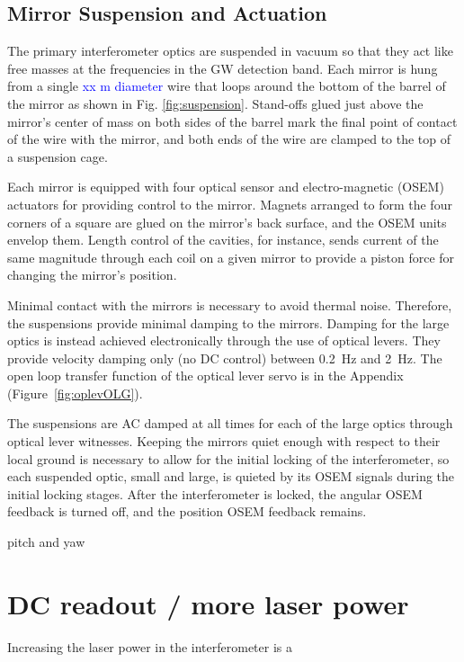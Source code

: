 \subsection{Mirror Suspension and Actuation}
\label{sec:suspension}
The primary interferometer optics are suspended in vacuum so that they
act like free masses at the frequencies in the GW detection band. Each
mirror is hung from a single \textcolor{blue}{xx m diameter} wire that
loops around the bottom of the barrel of the mirror as shown in
Fig. \ref{fig:suspension}. Stand-offs glued just above the mirror's
center of mass on both sides of the barrel mark the final point of
contact of the wire with the mirror, and both ends of the wire are
clamped to the top of a suspension cage.

Each mirror is equipped with four optical sensor and electro-magnetic
(OSEM) actuators for providing control to the mirror. Magnets arranged
to form the four corners of a square are glued on the mirror's back
surface, and the OSEM units envelop them. Length control of the
cavities, for instance, sends current of the same magnitude through
each coil on a given mirror to provide a piston force for changing the
mirror's position.

Minimal contact with the mirrors is necessary to avoid thermal
noise. Therefore, the suspensions provide minimal damping to the
mirrors. Damping for the large optics is instead achieved
electronically through the use of optical levers. They provide
velocity damping only (no DC control) between 0.2~Hz and 2~Hz. The
open loop transfer function of the optical lever servo is in the
Appendix (Figure~\ref{fig:oplevOLG}).

The suspensions are AC damped at all times for each of the large
optics through optical lever witnesses. Keeping the mirrors quiet
enough with respect to their local ground is necessary to allow for
the initial locking of the interferometer, so each suspended optic,
small and large, is quieted by its OSEM signals during the initial
locking stages. After the interferometer is locked, the angular OSEM
feedback is turned off, and the position OSEM feedback remains.

pitch and yaw



\section{DC readout / more laser power}
Increasing the laser power in the interferometer is a 

